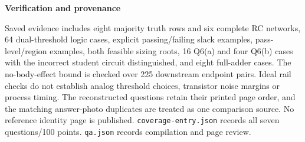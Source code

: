 \documentclass[10pt]{article}
\newcommand{\qheading}[1]{\par\medskip\textbf{#1}\par}
\begin{document}
\qheading{Verification and provenance}
Saved evidence includes eight majority truth rows and six complete RC networks, 64 dual-threshold logic cases, explicit passing/failing slack examples, pass-level/region examples, both feasible sizing roots, 16 Q6(a) and four Q6(b) cases with the incorrect student circuit distinguished, and eight full-adder cases. The no-body-effect bound is checked over 225 downstream endpoint pairs. Ideal rail checks do not establish analog threshold choices, transistor noise margins or process timing.
The reconstructed questions retain their printed page order, and the matching answer-photo duplicates are treated as one comparison source. No reference identity page is published. \texttt{coverage-entry.json} records all seven questions/100 points. \texttt{qa.json} records compilation and page review.
\end{document}
